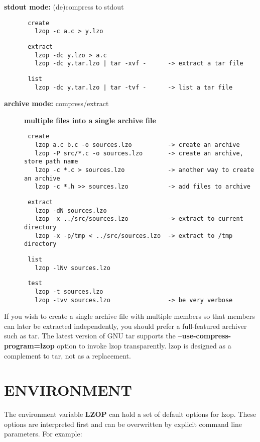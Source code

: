 \begin{description}
\item[{\textbf{stdout mode:} (de)compress to stdout}] \mbox{}\begin{verbatim}
 create
   lzop -c a.c > y.lzo
\end{verbatim}
\begin{verbatim}
 extract
   lzop -dc y.lzo > a.c
   lzop -dc y.tar.lzo | tar -xvf -      -> extract a tar file
\end{verbatim}
\begin{verbatim}
 list
   lzop -dc y.tar.lzo | tar -tvf -      -> list a tar file
\end{verbatim}

\item[{\textbf{archive mode:} compress/extract}] \textbf{multiple files into a single archive file}\begin{verbatim}
 create
   lzop a.c b.c -o sources.lzo          -> create an archive
   lzop -P src/*.c -o sources.lzo       -> create an archive, store path name
   lzop -c *.c > sources.lzo            -> another way to create an archive
   lzop -c *.h >> sources.lzo           -> add files to archive
\end{verbatim}
\begin{verbatim}
 extract
   lzop -dN sources.lzo
   lzop -x ../src/sources.lzo           -> extract to current directory
   lzop -x -p/tmp < ../src/sources.lzo  -> extract to /tmp directory
\end{verbatim}
\begin{verbatim}
 list
   lzop -lNv sources.lzo
\end{verbatim}
\begin{verbatim}
 test
   lzop -t sources.lzo
   lzop -tvv sources.lzo                -> be very verbose
\end{verbatim}
\end{description}


If you wish to create a single archive file with multiple
members so that members can later be extracted independently,
you should prefer a full-featured archiver such as
tar. The latest version of GNU tar supports the
\textbf{--use-compress-program=lzop} option to invoke lzop transparently.
lzop is designed as a complement to tar, not as
a replacement.

\section{ENVIRONMENT\label{ENVIRONMENT}}


The environment variable \textbf{LZOP} can hold a set of default
options for lzop. These options are interpreted first and
can be overwritten by explicit command line parameters.
For example:


